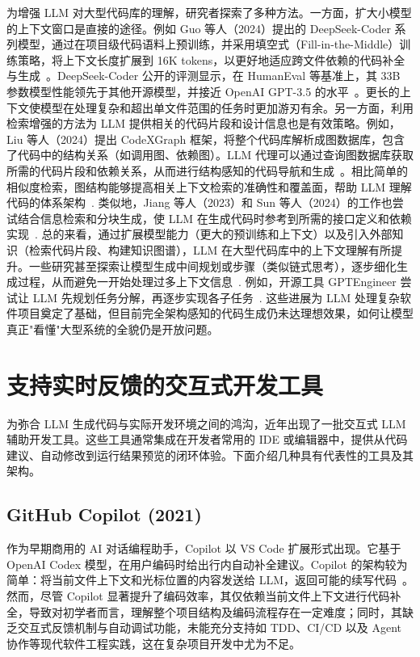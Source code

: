 为增强 LLM 对大型代码库的理解，研究者探索了多种方法。一方面，扩大小模型的上下文窗口是直接的途径。例如 Guo 等人（2024）提出的 DeepSeek-Coder 系列模型，通过在项目级代码语料上预训练，并采用填空式（Fill-in-the-Middle）训练策略，将上下文长度扩展到 16K tokens，以更好地适应跨文件依赖的代码补全与生成~\cite{arxiv2401,Guo2024}。DeepSeek-Coder 公开的评测显示，在 HumanEval 等基准上，其 33B 参数模型性能领先于其他开源模型，并接近 OpenAI GPT-3.5 的水平~\cite{arxiv2401}。更长的上下文使模型在处理复杂和超出单文件范围的任务时更加游刃有余。另一方面，利用检索增强的方法为 LLM 提供相关的代码片段和设计信息也是有效策略。例如，Liu 等人（2024）提出 CodeXGraph 框架，将整个代码库解析成图数据库，包含了代码中的结构关系（如调用图、依赖图）。LLM 代理可以通过查询图数据库获取所需的代码片段和依赖关系，从而进行结构感知的代码导航和生成~\cite{LLMCodeGraph2024}。相比简单的相似度检索，图结构能够提高相关上下文检索的准确性和覆盖面，帮助 LLM 理解代码的体系架构~\cite{LLMCodeGraph2024}. 类似地，Jiang 等人（2023）和 Sun 等人（2024）的工作也尝试结合信息检索和分块生成，使 LLM 在生成代码时参考到所需的接口定义和依赖实现~\cite{LLMCodeGraph2024}. 总的来看，通过扩展模型能力（更大的预训练和上下文）以及引入外部知识（检索代码片段、构建知识图谱），LLM 在大型代码库中的上下文理解有所提升。一些研究甚至探索让模型生成中间规划或步骤（类似链式思考），逐步细化生成过程，从而避免一开始处理过多上下文信息~\cite{DivaCopilot}. 例如，开源工具 GPTEngineer 尝试让 LLM 先规划任务分解，再逐步实现各子任务~\cite{DivaCopilot}. 这些进展为 LLM 处理复杂软件项目奠定了基础，但目前完全架构感知的代码生成仍未达理想效果，如何让模型真正"看懂"大型系统的全貌仍是开放问题。

\section{支持实时反馈的交互式开发工具}

为弥合 LLM 生成代码与实际开发环境之间的鸿沟，近年出现了一批交互式 LLM 辅助开发工具。这些工具通常集成在开发者常用的 IDE 或编辑器中，提供从代码建议、自动修改到运行结果预览的闭环体验。下面介绍几种具有代表性的工具及其架构。

\subsection{GitHub Copilot (2021)}
作为早期商用的 AI 对话编程助手，Copilot 以 VS Code 扩展形式出现。它基于 OpenAI Codex 模型，在用户编码时给出行内自动补全建议。Copilot 的架构较为简单：将当前文件上下文和光标位置的内容发送给 LLM，返回可能的续写代码~\cite{DivaCopilot}。然而，尽管 Copilot 显著提升了编码效率，其仅依赖当前文件上下文进行代码补全，导致对初学者而言，理解整个项目结构及编码流程存在一定难度；同时，其缺乏交互式反馈机制与自动调试功能，未能充分支持如 TDD、CI/CD 以及 Agent 协作等现代软件工程实践，这在复杂项目开发中尤为不足。

